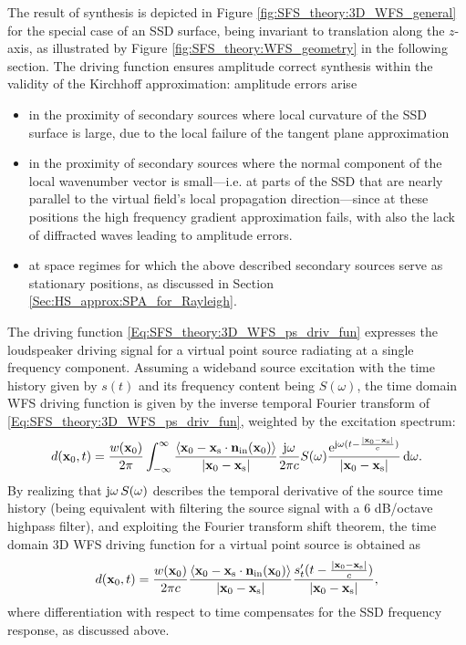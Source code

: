 The result of synthesis is depicted in Figure \ref{fig:SFS_theory:3D_WFS_general} for the special case of an SSD surface, being invariant to translation along the $z$-axis, as illustrated by Figure \ref{fig:SFS_theory:WFS_geometry} in the following section.
The driving function ensures amplitude correct synthesis within the validity of the Kirchhoff approximation:
amplitude errors arise 
\begin{itemize}
\item in the proximity of secondary sources where local curvature of the SSD surface is large, due to the local failure of the tangent plane approximation
\item in the proximity of secondary sources where the normal component of the local wavenumber vector is small---i.e. at parts of the SSD that are nearly parallel to the virtual field's local propagation direction---since at these positions the high frequency gradient approximation fails, with also the lack of diffracted waves leading to amplitude errors.
\item at space regimes for which the above described secondary sources serve as stationary positions, as discussed in Section \ref{Sec:HS_approx:SPA_for_Rayleigh}.
\end{itemize}

The driving function \eqref{Eq:SFS_theory:3D_WFS_ps_driv_fun} expresses the loudspeaker driving signal for a virtual point source radiating at a single frequency component.
Assuming a wideband source excitation with the time history given by $s(t)$ and its frequency content being $S(\omega)$, the time domain WFS driving function is given by the inverse temporal Fourier transform of \eqref{Eq:SFS_theory:3D_WFS_ps_driv_fun}, weighted by the excitation spectrum:
\begin{equation}
d(\mathbf{x}_0,t) = \frac{w(\mathbf{x}_0)}{2\pi} \int_{-\infty}^{\infty} \frac{\left< \mathbf{x}_0-\mathbf{x}_{\mathrm{s}} \cdot \mathbf{n}_{\mathrm{in}}(\mathbf{x}_0) \right> }{|\mathbf{x}_0-\mathbf{x}_{\mathrm{s}}|} \frac{\mathrm{j} \omega }{2\pi c} S(\omega) \frac{\mathrm{e}^{ \mathrm{j} \omega ( t - \frac{|\mathbf{x}_0-\mathbf{x}_{\mathrm{s}}|}{c} ) }}{|\mathbf{x}_0-\mathbf{x}_{\mathrm{s}}|} 
\, \mathrm{d} \omega.
\end{equation}
By realizing that $\mathrm{j} \omega \, S(\omega)$ describes the temporal derivative of the source time history (being equivalent with filtering the source signal with a 6 dB/octave highpass filter), and exploiting the Fourier transform shift theorem, the time domain 3D WFS driving function for a virtual point source is obtained as
\begin{equation}
\label{Eq:SFS_theory:3D_WFS_ps_driv_fun_td}
d(\mathbf{x}_0,t) = \frac{w(\mathbf{x}_0)}{2\pi c} \frac{\left< \mathbf{x}_0-\mathbf{x}_{\mathrm{s}} \cdot \mathbf{n}_{\mathrm{in}}(\mathbf{x}_0) \right> }{|\mathbf{x}_0-\mathbf{x}_{\mathrm{s}}|} \frac{s'_t(t - \frac{|\mathbf{x}_0-\mathbf{x}_{\mathrm{s}}|}{c} )}{|\mathbf{x}_0-\mathbf{x}_{\mathrm{s}}|},
\end{equation}
where differentiation with respect to time compensates for the SSD frequency response, as discussed above.

